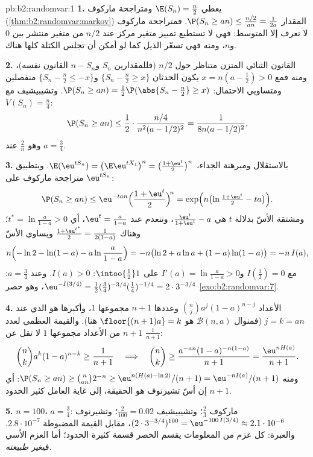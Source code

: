 \begin{solution}{pb:b2:randomvar:1}
\textbf{1.} يعطي $\E(S_n) = \frac n2$ ومتراجحة ماركوف (\cref{thm:b2:randomvar:markov}) المقدار $\P(S_n \geq an) \leq
\frac{n/2}{an} = \frac1{2a}$.
فمتراجحة ماركوف لا تعرف إلا المتوسط: فهي لا تستطيع تمييز متغير مركز
عند $n/2$ من متغير منتشر بين $0$ و$n$، ومنه فهي تسعّر الذيل
كما لو أمكن أن تجلس الكتلة كلها هناك.

\textbf{2.} القانون الثنائي المتزن متناظر حول $n/2$ (فللمقدارين
$S_n$ و$n - S_n$ القانون نفسه)، ومنه فمع $x = n(a -
\frac12) > 0$ يكون الحدثان $\{S_n - \frac n2 \geq x\}$
و$\{S_n - \frac n2 \leq -x\}$ منفصلين ومتساويي الاحتمال: $\P(S_n \geq an) = \frac12\P(\abs{S_n - \frac n2} \geq x)$. وتشيبيشيف مع $V(S_n) = \frac n4$:
\[
\P(S_n \geq an)
\leq \frac12\cdot\frac{n/4}{n^2(a - 1/2)^2}
= \frac1{8n(a - 1/2)^2},
\]
وهو $\frac2n$ عند $a = \frac34$.

\textbf{3.} بالاستقلال ومبرهنة الجداء، $\E(\eu^{tS_n}) = \bigl(\E \eu^{tX_1}\bigr)^n = \bigl(\frac{1
+ \eu^t}2\bigr)^n$. وبتطبيق متراجحة
ماركوف على $\eu^{tS_n}$:
\[
\P(S_n \geq an) \leq \eu^{-tan}\Bigl(\frac{1 +
\eu^t}2\Bigr)^{\!n} = \exp\Bigl(n\bigl(\ln\tfrac{1 +
\eu^t}2 - ta\bigr)\Bigr).
\]
ومشتقة الأسّ بدلالة $t$ هي $\frac{\eu^t}{1 + \eu^t}
- a$، وتنعدم عند $\eu^t = \frac a{1-a}$، أي $t^* =
\ln\frac a{1-a} > 0$؛
وهناك $\frac{1 + \eu^{t^*}}2 =
\frac1{2(1-a)}$ ويساوي الأسّ
\[
n\Bigl(-\ln 2 - \ln(1-a) - a\ln\frac a{1-a}\Bigr)
= -n\bigl(\ln2 + a\ln a + (1-a)\ln(1-a)\bigr) = -n\,I(a),
\]
مع $I(\frac12) = 0$ و$I'(a) = \ln\frac a{1-a} > 0$ على $\intoo{\frac12}1$: $I(a) > 0$. وعند $a = \frac34$: $\eu^{-I(3/4)} = \frac12(\tfrac34)^{-3/4}(\tfrac14)^{-1/4} =
2\cdot3^{-3/4}$، وهو
حصر \cref{exo:b2:randomvar:7}.

\textbf{4.} الأعداد $\binom nja^j(1-a)^{n-j}$ وعددها $n + 1$ مجموعها $1$، وأكبرها
هو الذي عند $j = k = an$ (فمنوال $\mathcal B(n, a)$ هو $\floor{(n+1)a} = k$ هنا). والقيمة العظمى
لعدد $n + 1$ من الأعداد مجموعها $1$ لا تقل عن $\frac1{n+1}$:
\[
\binom nk a^k(1-a)^{n-k} \geq \frac1{n+1}
\quad\Longrightarrow\quad
\binom nk \geq \frac{a^{-an}(1-a)^{-n(1-a)}}{n+1}
= \frac{\eu^{nH(a)}}{n+1}.
\]
ومنه $\P(S_n \geq an) \geq \binom{n}{an}2^{-n} \geq
\eu^{n(H(a) - \ln2)}/(n+1) = \eu^{-nI(a)}/(n+1)$: أي إن أسّ تشيرنوف هو الحقيقة، إلى غاية العامل كثير
الحدود $n + 1$.

\textbf{5.} $n = 100$، $a = \frac34$: ماركوف $\frac23$؛ وتشيبيشيف $\frac2{100} = 0.02$؛
وتشيرنوف $(2\cdot3^{-3/4})^{100} = \eu^{-100\,I(3/4)} \approx
2.1\cdot10^{-6}$، مقابل القيمة المضبوطة $2.8\cdot10^{-7}$. والعبرة: كل عزم من
المعلومات يقسم الحصر قسمة كثيرة الحدود؛ أما العزم الأسي فيغير
\emph{طبيعته}.


\end{solution}
